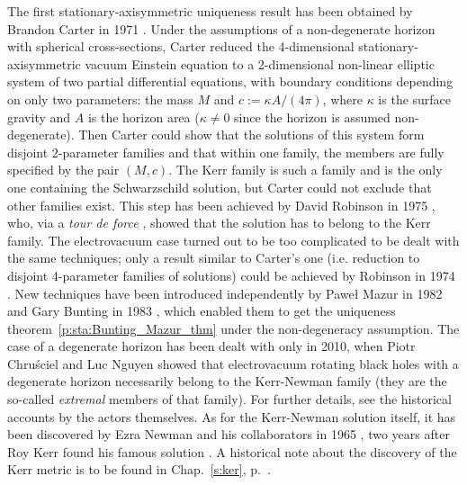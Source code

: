 \begin{hist}
\label{h:sta:axisym_uniqueness}
The first stationary-axisymmetric uniqueness result has been obtained
by Brandon Carter in 1971 \cite{Carte71}. Under the
assumptions of a non-degenerate horizon with spherical cross-sections,
Carter reduced the 4-dimensional stationary-axisymmetric
vacuum Einstein equation to a 2-dimensional non-linear elliptic system
of two partial differential equations,
with boundary conditions depending on only two parameters: the mass $M$
and $c := \kappa A/(4\pi)$, where $\kappa$ is the surface gravity and $A$
is the horizon area ($\kappa \neq 0$ since the horizon is assumed non-degenerate).
Then Carter could show that the solutions
of this system form disjoint 2-parameter families and that within one family,
the members are fully specified by the pair $(M, c)$. The Kerr family is
such a family and is the only one containing the Schwarzschild solution, but
Carter could not exclude that other families exist. This step has been achieved
by David Robinson in 1975 \cite{Robin75}, who,
via a \emph{tour de force} \cite{Carte99}, showed
that the solution has to belong to the Kerr family.
The electrovacuum case turned out to be too complicated
to be dealt with the same techniques; only a result similar to Carter's
one (i.e. reduction to disjoint 4-parameter families of solutions)
could be achieved by Robinson in 1974 \cite{Robin74}.
New techniques have been introduced independently
by Pawe\l{} Mazur in 1982 \cite{Mazur82} and
Gary Bunting in 1983 \cite{Bunti83}, which enabled
them to get the uniqueness theorem~\ref{p:sta:Bunting_Mazur_thm}
under the non-degeneracy assumption. The case of a degenerate horizon
has been dealt with only in 2010, when Piotr Chru\'sciel
and Luc Nguyen \cite{ChrusN10}
showed that electrovacuum rotating black holes with a degenerate horizon
necessarily belong to the Kerr-Newman family (they are the so-called
\emph{extremal} members of that family).
For further details, see the historical accounts \cite{Carte99,Mazur01,Robin09}
by the actors themselves. As for the Kerr-Newman solution itself, it has
been discovered by Ezra Newman and his collaborators in 1965 \cite{Newma_al65}, two years after Roy Kerr
found his famous solution \cite{Kerr63}. A historical note about the discovery of the Kerr metric is to be found in Chap.~\ref{s:ker}, p.~\pageref{h:ker:Kerr_sol}.
\end{hist}

